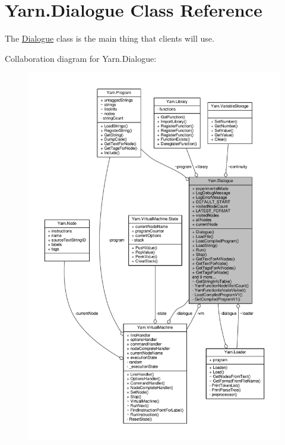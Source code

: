 \hypertarget{a00094}{\section{Yarn.\-Dialogue Class Reference}
\label{a00094}
}


The \hyperlink{a00094}{Dialogue} class is the main thing that clients will use.  




Collaboration diagram for Yarn.\-Dialogue\-:
\nopagebreak
\begin{figure}[H]
\begin{center}
\leavevmode
\includegraphics[width=350pt]{a00621}
\end{center}
\end{figure}
